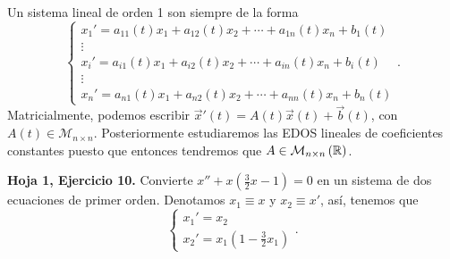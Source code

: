 \begin{observation}
Un sistema lineal de orden 1 son siempre de la forma 
\[
\begin{cases}
x_{1}' = a_{11}\left(t\right)x_{1} +a_{12}\left(t\right)x_{2} + \cdots + a_{1n}\left(t\right)x_{n} + b_{1}\left(t\right) \\
\vdots \\
x_{i}' = a_{i1}\left(t\right)x_{1} + a_{i2}\left(t\right)x_{2} + \cdots + a_{in}\left(t\right)x_{n}+ b_{i}\left(t\right) \\ 
\vdots \\
x_{n}' = a_{n1}\left(t\right)x_{1} + a_{n2}\left(t\right)x_{2} + \cdots + a_{nn}\left(t\right)x_{n} + b_{n}\left(t\right)
\end{cases}
.\]
Matricialmente, podemos escribir $\displaystyle \vec{x}'\left(t\right) = A\left(t\right)\vec{x}\left(t\right) + \vec{b}\left(t\right) $, con $\displaystyle A\left(t\right) \in \mathcal{M}_{n \times n} $. Posteriormente estudiaremos las EDOS lineales de coeficientes constantes puesto que entonces tendremos que $\displaystyle A \in \mathcal{M}_{n \times n}\left(\mathbb{R}\right) $. 
\end{observation}

\begin{eg}
\textbf{Hoja 1, Ejercicio 10.} Convierte $\displaystyle x'' + x\left(\frac{3}{2}x - 1\right) = 0 $ en un sistema de dos ecuaciones de primer orden. Denotamos $\displaystyle x_{1} \equiv x $ y $\displaystyle x_{2} \equiv x' $, así, tenemos que 
\[
\begin{cases}
x_{1}' = x_{2} \\
x_{2}' = x_{1}\left(1 - \frac{3}{2}x_{1}\right)
\end{cases}
.\]
\end{eg}
